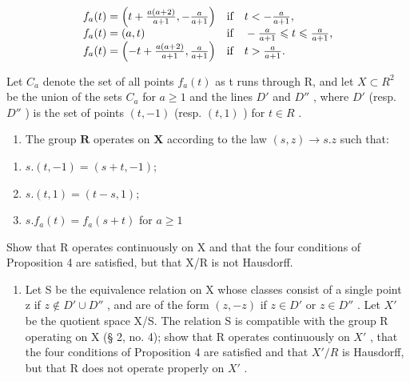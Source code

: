 \[
\begin{array}{l l} f _ {a} (t) = \left(t + \frac {a (a + 2)}{a + 1}, - \frac {a}{a + 1}\right) & \text {if} \quad t <   - \frac {a}{a + 1}, \\ f _ {a} (t) = (a, t) & \text {if} \quad - \frac {a}{a + 1} \leqslant t \leqslant \frac {a}{a + 1}, \\ f _ {a} (t) = \left(- t + \frac {a (a + 2)}{a + 1}, \frac {a}{a + 1}\right) & \text {if} \quad t > \frac {a}{a + 1}. \end{array}
\]

Let \(C_{a}\) denote the set of all points \(f_{a}(t)\) as t runs through R, and let \(X \subset R^{2}\) be the union of the sets \(C_{a}\) for \(a \geqslant 1\) and the lines \(D'\) and \(D''\) , where \(D'\) (resp. \(D''\) ) is the set of points \((t, -1)\) (resp. \((t, 1)\) ) for \(t \in R\) .

\begin{enumerate}
\def\labelenumi{\alph{enumi})}
\tightlist
\item
  The group \(\mathbf{R}\) operates on \(\mathbf{X}\) according to the law \((s, z) \to s.z\) such that:
\end{enumerate}

\begin{enumerate}
\def\labelenumi{(\roman{enumi})}
\item
  \(s.(t, -1) = (s + t, -1);\)
\item
  \(s.(t,1) = (t - s,1);\)
\item
  \(s.f_{a}(t) = f_{a}(s + t)\) for \(a\geqslant 1\)
\end{enumerate}

Show that R operates continuously on X and that the four conditions of Proposition 4 are satisfied, but that X/R is not Hausdorff.

\begin{enumerate}
\def\labelenumi{\alph{enumi})}
\setcounter{enumi}{1}
\tightlist
\item
  Let S be the equivalence relation on X whose classes consist of a single point z if \(z \notin D' \cup D''\) , and are of the form \((z, -z)\) if \(z \in D'\) or \(z \in D''\) . Let \(X'\) be the quotient space X/S. The relation S is compatible with the group R operating on X (§ 2, no. 4); show that R operates continuously on \(X'\) , that the four conditions of Proposition 4 are satisfied and that \(X'/R\) is Hausdorff, but that R does not operate properly on \(X'\) .
\end{enumerate}

